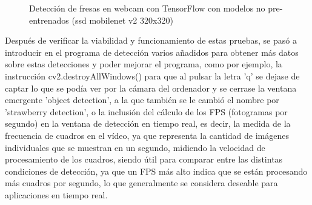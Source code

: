 \begin{figure}[H]
    \hspace{1mm}
    \hspace{1mm}
    
    \caption{Detección de fresas en webcam con TensorFlow con modelos no pre-entrenados (ssd mobilenet v2 320x320)}
    \label{fig:deteccion_Fresas_webcam_TF_ssdmobilenet}
\end{figure}

Después de verificar la viabilidad y funcionamiento de estas pruebas, se pasó a introducir en el programa de detección varios añadidos para obtener más datos sobre estas detecciones y poder mejorar el programa, como por ejemplo, la instrucción cv2.destroyAllWindows() para que al pulsar la letra 'q' se dejase de captar lo que se podía ver por la cámara del ordenador y se cerrase la ventana emergente 'object detection', a la que también se le cambió el nombre por 'strawberry detection', o la inclusión del cálculo de los FPS (fotogramas por segundo) en la ventana de detección en tiempo real, es decir, la medida de la frecuencia de cuadros en el vídeo, ya que representa la cantidad de imágenes individuales que se muestran en un segundo, midiendo la velocidad de procesamiento de los cuadros, siendo útil para comparar entre las distintas condiciones de detección, ya que un FPS más alto indica que se están procesando más cuadros por segundo, lo que generalmente se considera deseable para aplicaciones en tiempo real. 

